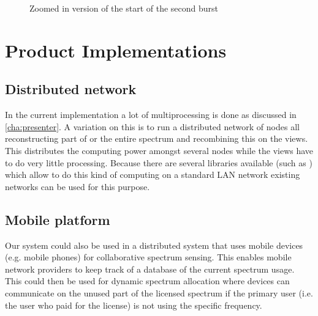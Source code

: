 \documentclass[a4paper, openany, oneside]{memoir}
\begin{document}
\begin{figure}[H]
\centering
{}
\caption{Zoomed in version of the start of the second burst}
\label{fig:plot_samplers_zoom}
\end{figure}


\section{Product Implementations}
\label{sec:product_implementations}

\subsection{Distributed network}
\label{sec:distributed}
In the current implementation a lot of multiprocessing is done as discussed in \cref{cha:presenter}. A variation on this is to run a distributed network of nodes all reconstructing part of or the entire spectrum and recombining this on the views. This distributes the computing power amongst several nodes while the views  have to do very little processing. Because there are several libraries available (such as ) which allow to do this kind of computing on a standard LAN network existing networks can be used for this purpose.


\subsection{Mobile platform}
\label{sub:mobile_platform}
Our system could also be used in a distributed system that uses mobile devices (e.g. mobile phones) for collaborative spectrum sensing. This enables mobile network providers to keep track of a database of the current spectrum usage. This could then be used for dynamic spectrum allocation where devices can communicate on the unused part of the licensed spectrum if the primary user (i.e. the user who paid for the license) is not using the specific frequency.
\end{document}
